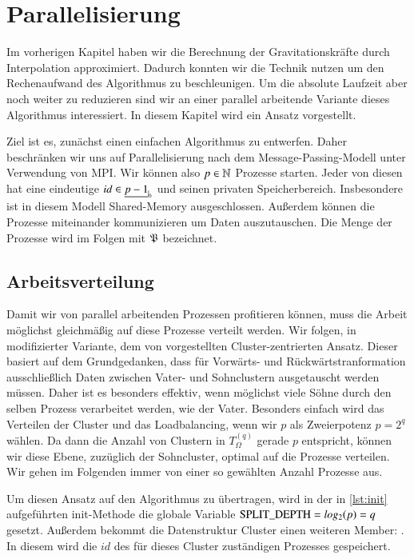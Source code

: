 \section{Parallelisierung}
\label{sec:parallelpart}
  Im vorherigen Kapitel haben wir die Berechnung der Gravitationskräfte durch Interpolation approximiert. Dadurch konnten wir die Technik \hquad nutzen um den Rechenaufwand des Algorithmus zu 
  beschleunigen.
  Um die absolute Laufzeit aber noch weiter zu reduzieren sind wir an einer parallel arbeitende Variante dieses Algorithmus interessiert. In diesem Kapitel wird ein Ansatz vorgestellt.
  
  Ziel ist es, zunächst einen einfachen Algorithmus zu entwerfen. Daher beschränken wir uns auf Parallelisierung nach dem Message-Passing-Modell unter Verwendung von MPI. Wir können also 
  $p \in \mathbb{N}$ Prozesse starten. Jeder von diesen hat eine eindeutige $id \in \nullhaken{p-1}$ und seinen privaten Speicherbereich. Insbesondere ist in diesem Modell Shared-Memory ausgeschlossen. 
  Außerdem können die Prozesse miteinander kommunizieren um Daten auszutauschen. Die Menge der Prozesse wird im Folgen mit $\mathfrak{P}$ bezeichnet.

  
  \subsection{Arbeitsverteilung}
  \label{sec:work}
    Damit wir von parallel arbeitenden Prozessen profitieren können, muss die Arbeit möglichst gleichmäßig auf diese Prozesse verteilt werden. Wir folgen, in modifizierter Variante, dem von 
    \citet{distrh2} vorgestellten Cluster-zentrierten Ansatz. 
    Dieser basiert auf dem Grundgedanken, dass für Vorwärts- und Rückwärtstranformation ausschließlich Daten zwischen Vater- und Sohnclustern ausgetauscht werden müssen. Daher ist es besonders 
    effektiv, wenn möglichst viele Söhne durch den selben Prozess verarbeitet werden, wie der Vater. Besonders einfach wird das Verteilen der Cluster und das Loadbalancing, wenn wir $p$ als 
    Zweierpotenz $p = 2^q$ wählen. Da dann die Anzahl von Clustern in $T_\Omega^{(q)}$ gerade $p$ entspricht, können wir diese Ebene, zuzüglich der Sohncluster, optimal auf die Prozesse verteilen.
    Wir gehen im Folgenden immer von einer so gewählten Anzahl Prozesse aus.
    
    Um diesen Ansatz auf den Algorithmus zu übertragen, wird in der in \autoref{lst:init} aufgeführten init-Methode die globale Variable $\tcode{SPLIT_DEPTH} = log_2(p) = q$ gesetzt. 
    Außerdem bekommt die Datenstruktur \code Cluster einen weiteren Member: . In diesem  wird die $id$ des für dieses Cluster zuständigen Prozesses gespeichert.
    
